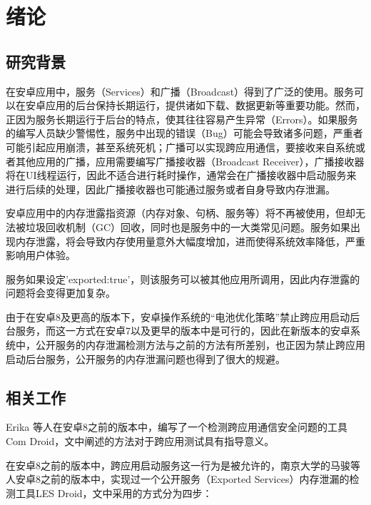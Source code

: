 \chapter{绪论}\label{chapter_introduction}
\section{研究背景}
在安卓应用中，服务（Services）和广播（Broadcast）得到了广泛的使用。服务可以在安卓应用的后台保持长期运行，提供诸如下载、数据更新等重要功能。然而，正因为服务长期运行于后台的特点，使其往往容易产生异常（Errors）。如果服务的编写人员缺少警惕性，服务中出现的错误（Bug）可能会导致诸多问题，严重者可能引起应用崩溃，甚至系统死机；广播可以实现跨应用通信，要接收来自系统或者其他应用的广播，应用需要编写广播接收器（Broadcast Receiver），广播接收器将在UI线程运行，因此不适合进行耗时操作，通常会在广播接收器中启动服务来进行后续的处理，因此广播接收器也可能通过服务或者自身导致内存泄漏。

安卓应用中的内存泄露指资源（内存对象、句柄、服务等）将不再被使用，但却无法被垃圾回收机制（GC）回收，同时也是服务中的一大类常见问题。服务如果出现内存泄露，将会导致内存使用量意外大幅度增加，进而使得系统效率降低，严重影响用户体验。

服务如果设定'exported:true'，则该服务可以被其他应用所调用，因此内存泄露的问题将会变得更加复杂。

由于在安卓8及更高的版本下，安卓操作系统的“电池优化策略”禁止跨应用启动后台服务\cite{android-service-limit}，而这一方式在安卓7以及更早的版本中是可行的，因此在新版本的安卓系统中，公开服务的内存泄漏检测方法与之前的方法\cite{jun2018lesdroid}有所差别，也正因为禁止跨应用启动后台服务，公开服务的内存泄漏问题也得到了很大的规避。


\section{相关工作}

Erika 等人在安卓8之前的版本中，编写了一个检测跨应用通信安全问题的工具Com Droid\cite{chin2011analyzing}，文中阐述的方法对于跨应用测试具有指导意义。


在安卓8之前的版本中，跨应用启动服务这一行为是被允许的，南京大学的马骏等人安卓8之前的版本中，实现过一个公开服务（Exported Services）内存泄漏的检测工具LES Droid\cite{jun2018lesdroid}，文中采用的方式分为四步：

